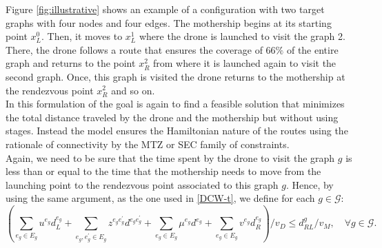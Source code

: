 \noindent
Figure \ref{fig:illustrative} shows an example of a configuration with two target graphs with four nodes and four edges. 
The mothership begins at its starting point $x_L^0$. Then, it moves to $x_L^1$ where the drone is launched to visit the graph 2. There, the drone follows a route that ensures the coverage of $66 \%$ of the entire graph and returns to the point $x_R^2$ from where it is launched again to visit the second graph. Once, this graph is visited the drone returns to the mothership at the rendezvous point $x_R^2$ and so on.\\
\noindent
In this formulation of \AMD\xspace the goal is again to find a feasible solution that minimizes the total distance traveled by the drone and the mothership but without using stages. Instead the model ensures the Hamiltonian nature of the routes using the rationale of connectivity by the MTZ or SEC family of constraints.\\
\noindent
Again, we need to be sure that the time spent by the drone to visit the graph $g$ is less than or equal to the time that the mothership needs to move from the launching point to the rendezvous point associated to this graph $g$. Hence, by using the same argument, as the one used in \eqref{DCW-t}, we define for each $g\in \mathcal G$:
\begin{equation}
 \left(\sum_{e_g\in E_g} u^{e_g}d_L^{e_g} + \sum_{e_g, e^\prime_g\in E_g}z^{e_ge^\prime_g}d^{e_ge^\prime_g} + \sum_{e_g\in E_g} \mu^{e_g} d^{e_g} + \sum_{e_g\in E_g}v^{e_g}d_R^{e_g}\right)/v_D\leq d_{RL}^{g}/v_M, \quad\forall g\in\mathcal G.\label{DCW-g}\tag{DCW-g}
\end{equation}

